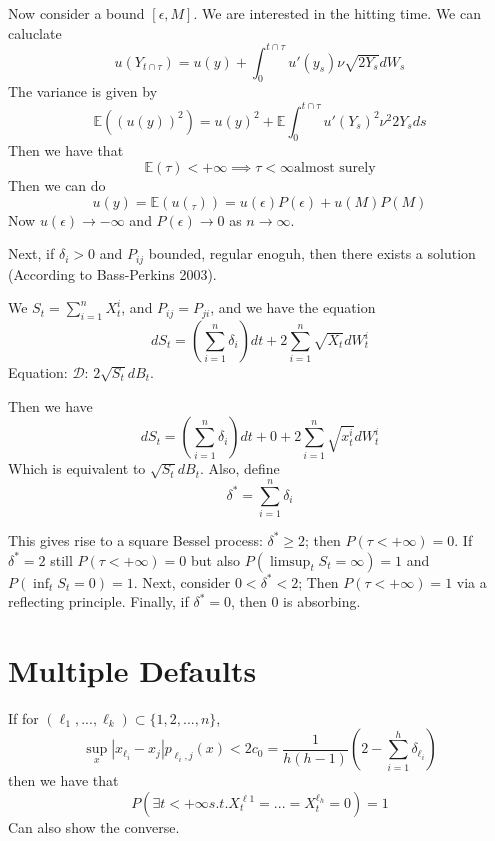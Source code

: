 Now consider a bound $[\epsilon, M]$. We are interested in the hitting time.
We can caluclate
\begin{equation}
	u(Y_{t \cap \tau}) = u(y) + \int_0^{t\cap \tau} u'(y_s) \nu \sqrt{2Y_s}dW_s
\end{equation}
The variance is given by
\begin{equation}
	\mathbb{E}( (u(y))^2) = u(y)^2 + \mathbb{E}\int_0^{t\cap \tau} u'(Y_s)^2 \nu^2 2 Y_s ds
\end{equation}
Then we have that
\begin{equation}
	\mathbb{E}(\tau) < +\infty \implies \tau < \infty \text{almost surely}
\end{equation}
Then we can do
\begin{equation}
	u(y) = \mathbb{E}(u(_\tau)) = u(\epsilon) P(\epsilon) + u(M)P(M)
\end{equation}
Now $u(\epsilon)\to -\infty$ and $P(\epsilon)\to 0$ as $n\to \infty$.

Next, if $\delta_i > 0$ and $P_{ij}$ bounded, regular enoguh, then there exists a solution (According to Bass-Perkins 2003).

We $S_t = \sum_{i=1}^n X_t^i$, and $P_{ij} = P_{ji}$, and we have the equation
\begin{equation}
	dS_t= (\sum_{i=1}^n \delta_i)dt + 2 \sum_{i=1}^n \sqrt{X_t} dW_t^i
\end{equation}
Equation: $\mathcal{D}$: $2 \sqrt{S_t} dB_t$.

Then we have
\begin{equation}
	dS_t = \left(\sum_{i=1}^n \delta_i \right)dt + 0 + 2\sum_{i=1}^n \sqrt{x^i_t} dW^i_t
\end{equation}
Which is equivalent to $\sqrt{S_t}dB_t$. Also, define
\begin{equation}
	\delta^* = \sum_{i=1}^n \delta_i
\end{equation}

This gives rise to a square Bessel process: $\delta^*\geq 2$; then $P(\tau < +\infty)=0$. If $\delta^*=2$ still $P(\tau<+\infty)=0$ but also $P(\limsup_t S_t = \infty)=1$ and $P(\inf_t S_t = 0)=1$. Next, consider $0 < \delta^* < 2$; Then $P(\tau<+\infty)=1$ via a reflecting principle. Finally, if $\delta^*=0$, then $0$ is absorbing.

\section{Multiple Defaults}
If for $(\ell_1,...,\ell_k) \subset \{ 1,2,..., n \}$,
\begin{equation}
	\sup_x \left|x_{\ell_i} - x_j \right| p_{\ell_i, j}(x) < 2c_0 = \frac{1}{h(h-1)} \left(2 - \sum_{i=1}^h \delta_{\ell_i} \right) 
\end{equation}
then we have that
\begin{equation}
	P(\exists t < +\infty s.t. X_t^{\ell 1}=...=X_t^{\ell_h}=0) = 1
\end{equation}
Can also show the converse.

